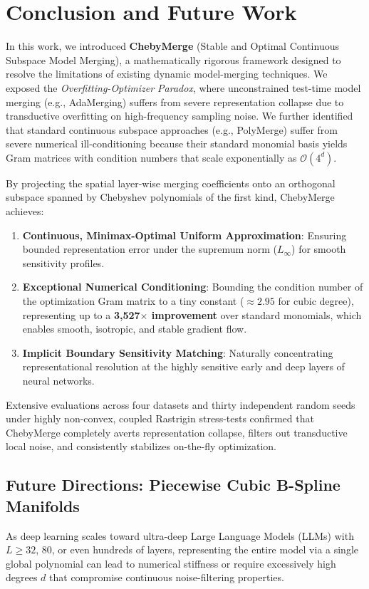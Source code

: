 \section{Conclusion and Future Work}
\label{sec:conclusion}

In this work, we introduced \textbf{ChebyMerge} (Stable and Optimal Continuous Subspace Model Merging), a mathematically rigorous framework designed to resolve the limitations of existing dynamic model-merging techniques. We exposed the \emph{Overfitting-Optimizer Paradox}, where unconstrained test-time model merging (e.g., AdaMerging) suffers from severe representation collapse due to transductive overfitting on high-frequency sampling noise. We further identified that standard continuous subspace approaches (e.g., PolyMerge) suffer from severe numerical ill-conditioning because their standard monomial basis yields Gram matrices with condition numbers that scale exponentially as $\mathcal{O}(4^d)$.

By projecting the spatial layer-wise merging coefficients onto an orthogonal subspace spanned by Chebyshev polynomials of the first kind, ChebyMerge achieves:
\begin{enumerate}
    \item \textbf{Continuous, Minimax-Optimal Uniform Approximation}: Ensuring bounded representation error under the supremum norm ($L_\infty$) for smooth sensitivity profiles.
    \item \textbf{Exceptional Numerical Conditioning}: Bounding the condition number of the optimization Gram matrix to a tiny constant ($\approx 2.95$ for cubic degree), representing up to a \textbf{3,527$\times$ improvement} over standard monomials, which enables smooth, isotropic, and stable gradient flow.
    \item \textbf{Implicit Boundary Sensitivity Matching}: Naturally concentrating representational resolution at the highly sensitive early and deep layers of neural networks.
\end{enumerate}

Extensive evaluations across four datasets and thirty independent random seeds under highly non-convex, coupled Rastrigin stress-tests confirmed that ChebyMerge completely averts representation collapse, filters out transductive local noise, and consistently stabilizes on-the-fly optimization. 

\subsection{Future Directions: Piecewise Cubic B-Spline Manifolds}
As deep learning scales toward ultra-deep Large Language Models (LLMs) with $L \ge 32$, $80$, or even hundreds of layers, representing the entire model via a single global polynomial can lead to numerical stiffness or require excessively high degrees $d$ that compromise continuous noise-filtering properties. 

